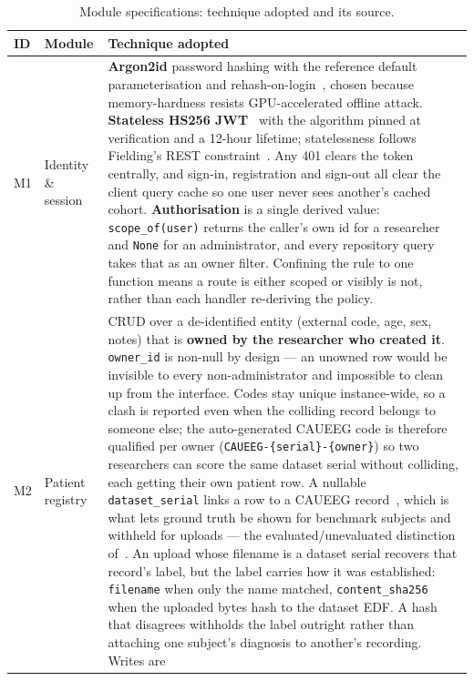 \documentclass[11pt,a4paper]{article}
\newcommand{\code}[1]{\texttt{#1}}
\begin{document}
\begin{table}[H]\centering
\caption{Module specifications: technique adopted and its source.}
\label{tab:modules}\scriptsize\renewcommand{\arraystretch}{1.15}
\begin{tabularx}{\linewidth}{@{}C{0.55cm} L{2.4cm} Y@{}}
\toprule
\textbf{ID} & \textbf{Module} & \textbf{Technique adopted} \\
\midrule
M1 & Identity \& session &
\textbf{Argon2id} password hashing with the reference default parameterisation
and rehash-on-login~\cite{biryukov2016}, chosen because memory-hardness resists
GPU-accelerated offline attack. \textbf{Stateless HS256 JWT}~\cite{rfc7519} with
the algorithm pinned at verification and a 12-hour lifetime; statelessness
follows Fielding's REST constraint~\cite{fielding2000}. Any 401 clears the token
centrally, and sign-in, registration and sign-out all clear the client query
cache so one user never sees another's cached cohort.
\textbf{Authorisation} is a single derived value: \code{scope\_of(user)} returns
the caller's own id for a researcher and \code{None} for an administrator, and
every repository query takes that as an owner filter. Confining the rule to one
function means a route is either scoped or visibly is not, rather than each
handler re-deriving the policy. \\
\addlinespace[2pt]
M2 & Patient registry &
CRUD over a de-identified entity (external code, age, sex, notes) that is
\textbf{owned by the researcher who created it}. \code{owner\_id} is non-null by
design --- an unowned row would be invisible to every non-administrator and
impossible to clean up from the interface. Codes stay unique instance-wide, so a
clash is reported even when the colliding record belongs to someone else; the
auto-generated CAUEEG code is therefore qualified per owner
(\code{CAUEEG-\{serial\}-\{owner\}}) so two researchers can score the same
dataset serial without colliding, each getting their own patient row. A nullable
\code{dataset\_serial} links a row to a CAUEEG record~\cite{kim2023}, which is
what lets ground truth be shown for benchmark subjects and withheld for uploads
--- the evaluated/unevaluated distinction of~\cite{mitchell2019}. An upload whose
filename is a dataset serial recovers that record's label, but the label carries how
it was established: \code{filename} when only the name matched,
\code{content\_sha256} when the uploaded bytes hash to the dataset EDF. A hash that
disagrees withholds the label outright rather than attaching one subject's diagnosis
to another's recording. Writes are

\end{tabularx}
\end{table}
\end{document}
